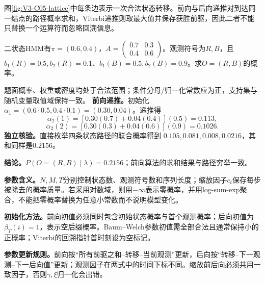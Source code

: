 \label{struct:V3-C05-CH17}

图\ref{fig:V3-C05-lattice}中每条边表示一次合法状态转移。前向与后向递推对到达同一结点的路径概率求和，Viterbi递推则取最大值并保存获胜前驱，因此二者不能只替换一个运算符而忽略回溯信息。

\label{struct:V3-C05-CH18}
\begin{example}[两状态HMM的前向概率]\label{exm:V3-C05-viterbi-numeric}
二状态HMM有$\pi=(0.6,0.4)$，$A=\begin{pmatrix}0.7&0.3\\0.4&0.6\end{pmatrix}$。观测符号为$R,B$，且$b_1(R)=0.5,b_2(R)=0.1$、$b_1(B)=0.5,b_2(B)=0.9$。求$O=(R,B)$的概率。
\end{example}
\begin{solution}
\SolGiven 题面概率、权重或密度均处于合法范围；条件分母/归一化常数应为正，支持集与随机变量取值域保持一致。
\SolDerive
\textbf{前向递推。}初始化$\alpha_1=(0.6\cdot0.5,0.4\cdot0.1)=(0.30,0.04)$。递推得
\[
\alpha_2(1)=[0.30(0.7)+0.04(0.4)](0.5)=0.113,
\]
\[
\alpha_2(2)=[0.30(0.3)+0.04(0.6)](0.9)=0.1026.
\]
\textbf{独立核验。}直接枚举四条状态路径的联合概率得到
$0.105,0.081,0.008,0.0216$，其和同样是$0.2156$。

\textbf{结论。}$P(O=(R,B)\mid\lambda)=0.2156$；前向算法的求和结果与路径穷举一致。
\end{solution}

\label{struct:V3-C05-CH19}
\label{struct:V3-C05-CH20}
\label{struct:V3-C05-CH21}
\textbf{参数含义。}$N,M,T$分别控制状态数、观测符号数和序列长度；缩放因子$c_t$保存每步被除去的概率质量。若采用对数域，则用$-\infty$表示零概率，并用log-sum-exp聚合，不能把零概率替换为任意小常数而不说明模型变化。

\label{struct:V3-C05-CH22}
\textbf{初始化方法。}前向初值必须同时包含初始状态概率与首个观测概率；后向初值为$\beta_T(i)=1$，表示空后缀概率。Baum--Welch参数初值需全部合法且通常保持小的正概率；Viterbi的回溯指针首时刻设为空标记。

\label{struct:V3-C05-CH23}
\textbf{参数更新规则。}前向按“所有前驱之和--转移--当前观测”更新，后向按“转移--下一观测--下一后向值”更新；观测因子在两式中的时间下标不同。缩放前后向必须共用一致因子，否则$\gamma,\xi$归一化会出错。


